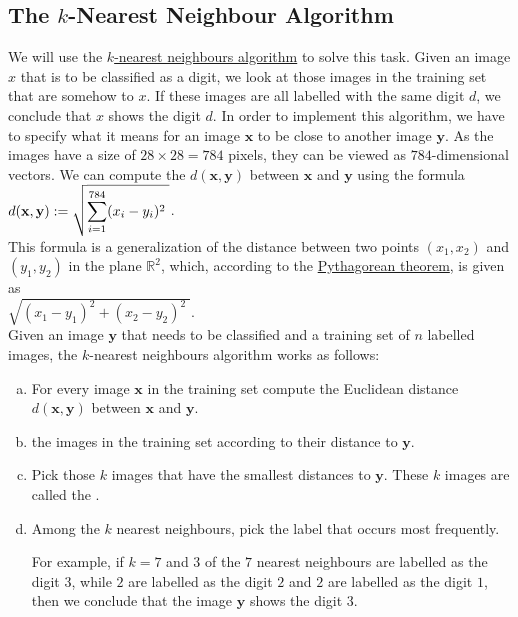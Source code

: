 \subsection{The $k$-Nearest Neighbour Algorithm}
We will use the \href{https://en.wikipedia.org/wiki/K-nearest_neighbors_algorithm}{$k$-nearest neighbours algorithm} 
to solve this task.  Given an image $x$ that is to be classified as a digit, we look at those images in the
training set that are somehow  to $x$.  If these images are all labelled with the same digit $d$,
we conclude that $x$ shows the digit $d$.  In order to implement this algorithm, we have to specify what it
means for an image $\mathbf{x}$ to be close to another image $\mathbf{y}$.  As the images have a size of $28 \times 28 = 784$
pixels, they can be viewed as $784$-dimensional vectors.  We can compute the 
$d(\mathbf{x}, \mathbf{y})$ between $\mathbf{x}$ and $\mathbf{y}$ using the formula
\\[0.2cm]
\hspace*{1.3cm}
$\displaystyle d(\mathbf{x}, \mathbf{y}) := \sqrt{\sum\limits_{i=1}^{784} (x_i - y_i)^2\;}$.
\\[0.2cm]
This formula is a generalization of the distance between two points $(x_1, x_2)$ and $(y_1, y_2)$ in the
plane $\mathbb{R}^2$, which, according to the \href{https://en.wikipedia.org/wiki/Pythagorean_theorem}{Pythagorean theorem}, is given as 
\\[0.2cm]
\hspace*{1.3cm}
$\sqrt{(x_1 - y_1)^2 + (x_2 - y_2)^2\;}$.
\\[0.2cm]
Given an image $\mathbf{y}$ that needs to be classified and a training set of $n$ labelled images, the $k$-nearest
neighbours algorithm works as follows: 
\begin{enumerate}[(a)]
\item For every image $\mathbf{x}$ in the training set compute the Euclidean distance $d(\mathbf{x},
  \mathbf{y})$ between $\mathbf{x}$ and $\mathbf{y}$.
\item {} the images in the training set according to their distance to $\mathbf{y}$.
\item Pick those $k$ images that have the smallest distances to $\mathbf{y}$.
      These $k$ images are called the .
\item Among the $k$ nearest neighbours, pick the label that occurs most frequently.
      
      For example, if $k=7$ and $3$ of the $7$ nearest neighbours are labelled as the digit $3$, while $2$ are
      labelled as the digit $2$ and $2$ are labelled as the digit $1$, then we conclude that the image
      $\mathbf{y}$ shows the digit $3$. 
\end{enumerate}

